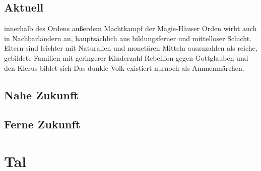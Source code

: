 \section{Aktuell}
\begin{outline}
	\1 innerhalb des Ordens außerdem Machtkampf der Magie-Häuser
	\1 Orden wirbt auch in Nachbarländern an, hauptsächlich aus bildungsferner und mittelloser Schicht.\\
	Eltern sind leichter mit Naturalien und monetären Mitteln auszuzahlen als reiche, gebildete Familien mit geringerer Kinderzahl
	\1 Rebellion gegen Gottglauben und den Klerus bildet sich
	\1 Das dunkle Volk existiert nurnoch als Ammenmärchen.
\end{outline}

\section{Nahe Zukunft}

\section{Ferne Zukunft}

\chapter{Tal}